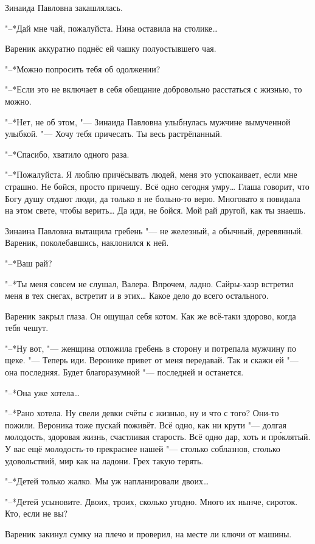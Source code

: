 Зинаида Павловна закашлялась.

"--*Дай мне чай, пожалуйста.
Нина оставила на столике\ldots{}

Вареник аккуратно поднёс ей чашку полуостывшего чая.

"--*Можно попросить тебя об одолжении?

"--*Если это не включает в себя обещание добровольно расстаться с жизнью, то можно.

"--*Нет, не об этом, "--- Зинаида Павловна улыбнулась мужчине вымученной улыбкой.
"--- Хочу тебя причесать.
Ты весь растрёпанный.

"--*Спасибо, хватило одного раза.

"--*Пожалуйста.
Я люблю причёсывать людей, меня это успокаивает, если мне страшно.
Не бойся, просто причешу.
Всё одно сегодня умру\ldots{}
Глаша говорит, что Богу душу отдают люди, да только я не больно-то верю.
Многовато я повидала на этом свете, чтобы верить\ldots{}
Да иди, не бойся.
Мой рай другой, как ты знаешь.

Зинаина Павловна вытащила гребень "--- не железный, а обычный, деревянный.
Вареник, поколебавшись, наклонился к ней.

"--*Ваш рай?

"--*Ты меня совсем не слушал, Валера.
Впрочем, ладно.
Сайры-хаэр встретил меня в тех снегах, встретит и в этих\ldots{}
Какое дело до всего остального.

Вареник закрыл глаза.
Он ощущал себя котом.
Как же всё-таки здорово, когда тебя чешут.

"--*Ну вот, "--- женщина отложила гребень в сторону и потрепала мужчину по щеке.
"--- Теперь иди.
Веронике привет от меня передавай.
Так и скажи ей "--- она последняя.
Будет благоразумной "--- последней и останется.

"--*Она уже хотела\ldots{}

"--*Рано хотела.
Ну свели девки счёты с жизнью, ну и что с того?
Они-то пожили.
Вероника тоже пускай поживёт.
Всё одно, как ни крути "--- долгая молодость, здоровая жизнь, счастливая старость.
Всё одно дар, хоть и пр\'оклятый.
У вас ещё молодость-то прекраснее нашей "--- столько соблазнов, столько удовольствий, мир как на ладони.
Грех такую терять.

"--*Детей только жалко.
Мы уж напланировали двоих\ldots{}

"--*Детей усыновите.
Двоих, троих, сколько угодно.
Много их нынче, сироток.
Кто, если не вы?

Вареник закинул сумку на плечо и проверил, на месте ли ключи от машины.

